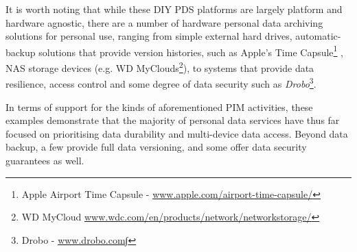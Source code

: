 \documentclass[graybox]{svmult}
\begin{document}
It is worth noting that while these DIY PDS platforms are largely platform and hardware agnostic, there are a number of hardware personal data archiving solutions for personal use, ranging from simple external hard drives, automatic-backup solutions that provide version histories, such as Apple’s Time Capsule\footnote{Apple Airport Time Capsule - \url{www.apple.com/airport-time-capsule/}} , NAS storage devices (e.g. WD MyClouds\footnote{WD MyCloud \url{www.wdc.com/en/products/network/networkstorage/}}), to systems that provide data resilience, access control and some degree of data security such as \emph{Drobo}\footnote{Drobo - \url{www.drobo.com∫}}.  




In terms of support for the kinds of aforementioned PIM activities, these examples demonstrate that the majority of personal data services have thus far focused on prioritising data durability and multi-device data access.  Beyond data backup, a few provide full data versioning, and some offer data security guarantees as well. 
\end{document}
